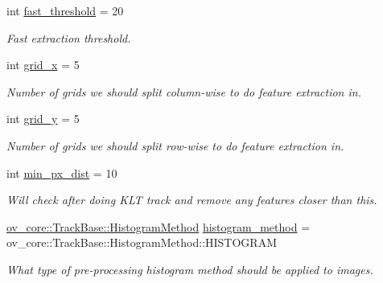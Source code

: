 \begin{DoxyCompactItemize}
int \hyperlink{structov__msckf_1_1VioManagerOptions_a27d862f8f1811211f895b27a3b789e3a}{fast\+\_\+threshold} = 20
\begin{DoxyCompactList}\small\item\em Fast extraction threshold. \end{DoxyCompactList}\item 
\mbox{\label{structov__msckf_1_1VioManagerOptions_ab52b09d507ef33dabe72d65a223fe067}} 
int \hyperlink{structov__msckf_1_1VioManagerOptions_ab52b09d507ef33dabe72d65a223fe067}{grid\+\_\+x} = 5
\begin{DoxyCompactList}\small\item\em Number of grids we should split column-\/wise to do feature extraction in. \end{DoxyCompactList}\item 
\mbox{\label{structov__msckf_1_1VioManagerOptions_a678920b0804fb40a14b22da61d49d631}} 
int \hyperlink{structov__msckf_1_1VioManagerOptions_a678920b0804fb40a14b22da61d49d631}{grid\+\_\+y} = 5
\begin{DoxyCompactList}\small\item\em Number of grids we should split row-\/wise to do feature extraction in. \end{DoxyCompactList}\item 
\mbox{\label{structov__msckf_1_1VioManagerOptions_a66d1e76bc9e8ffdd1c669d99fdce76b7}} 
int \hyperlink{structov__msckf_1_1VioManagerOptions_a66d1e76bc9e8ffdd1c669d99fdce76b7}{min\+\_\+px\+\_\+dist} = 10
\begin{DoxyCompactList}\small\item\em Will check after doing K\+LT track and remove any features closer than this. \end{DoxyCompactList}\item 
\mbox{\label{structov__msckf_1_1VioManagerOptions_a16dc81c1a909ece39ad6b8d46e01f17f}} 
\hyperlink{classov__core_1_1TrackBase_aa4b34a5dce99b59522d57bf9278c9a1a}{ov\+\_\+core\+::\+Track\+Base\+::\+Histogram\+Method} \hyperlink{structov__msckf_1_1VioManagerOptions_a16dc81c1a909ece39ad6b8d46e01f17f}{histogram\+\_\+method} = ov\+\_\+core\+::\+Track\+Base\+::\+Histogram\+Method\+::\+H\+I\+S\+T\+O\+G\+R\+AM
\begin{DoxyCompactList}\small\item\em What type of pre-\/processing histogram method should be applied to images. \end{DoxyCompactList}\item 

\end{DoxyCompactItemize}
